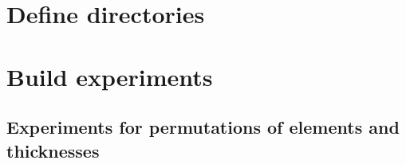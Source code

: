 \hypertarget{define-directories}{%
\section{Define directories}\label{define-directories}}

\begin{Shaded}
\begin{Highlighting}[]
\NormalTok{)}

\OperatorTok{=} 
\OperatorTok{=} 
\end{Highlighting}
\end{Shaded}

\begin{Shaded}
\begin{Highlighting}[]
\OperatorTok{=}
\end{Highlighting}
\end{Shaded}

\hypertarget{build-experiments}{%
\section{Build experiments}\label{build-experiments}}

\hypertarget{experiments-for-permutations-of-elements-and-thicknesses}{%
\subsection{Experiments for permutations of elements and
thicknesses}\label{experiments-for-permutations-of-elements-and-thicknesses}}

